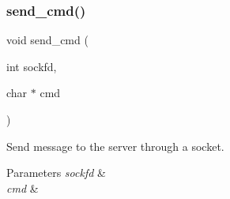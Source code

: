 \subsubsection{send\+\_\+cmd()}
{\footnotesize\ttfamily void send\+\_\+cmd (\begin{DoxyParamCaption}\item[{int}]{sockfd,  }\item[{char $\ast$}]{cmd }\end{DoxyParamCaption})}



Send message to the server through a socket. 


\begin{DoxyParams}{Parameters}
{\em sockfd} & \\
\hline
{\em cmd} & \\
\hline
\end{DoxyParams}
